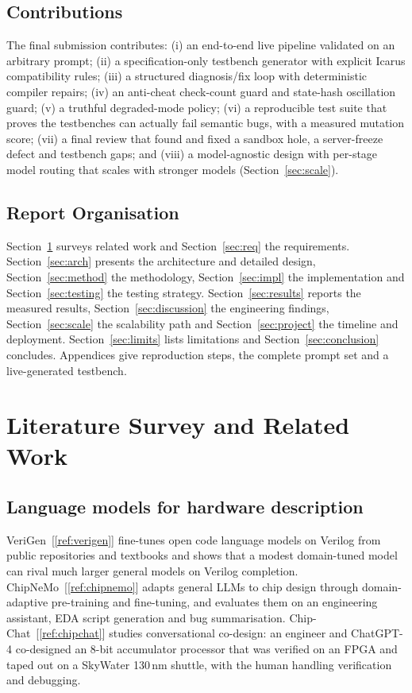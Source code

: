 \documentclass[11pt,a4paper]{article}
\renewcommand{\cite}[1]{[\ref{ref:#1}]}
\begin{document}
\subsection{Contributions}
The final submission contributes: (i) an end-to-end live pipeline validated on an
arbitrary prompt; (ii) a specification-only testbench generator with explicit Icarus
compatibility rules; (iii) a structured diagnosis/fix loop with deterministic
compiler repairs; (iv) an anti-cheat check-count guard and state-hash oscillation
guard; (v) a truthful degraded-mode policy; (vi) a reproducible test suite that
proves the testbenches can actually fail semantic bugs, with a measured mutation score; (vii) a final review that found and fixed a sandbox hole, a server-freeze defect and testbench gaps; and (viii) a model-agnostic design with per-stage model routing that scales with stronger models (Section~\ref{sec:scale}).

\subsection{Report Organisation}
Section~\ref{sec:related} surveys related work and Section~\ref{sec:req} the requirements. Section~\ref{sec:arch} presents the architecture and detailed design, Section~\ref{sec:method} the methodology, Section~\ref{sec:impl} the implementation and Section~\ref{sec:testing} the testing strategy. Section~\ref{sec:results} reports the measured results, Section~\ref{sec:discussion} the engineering findings, Section~\ref{sec:scale} the scalability path and Section~\ref{sec:project} the timeline and deployment. Section~\ref{sec:limits} lists limitations and Section~\ref{sec:conclusion} concludes. Appendices give reproduction steps, the complete prompt set and a live-generated testbench.

\section{Literature Survey and Related Work}
\label{sec:related}

\subsection{Language models for hardware description}
VeriGen~\cite{verigen} fine-tunes open code language models on Verilog from public repositories and textbooks and shows that a modest domain-tuned model can rival much larger general models on Verilog completion. ChipNeMo~\cite{chipnemo} adapts general LLMs to chip design through domain-adaptive pre-training and fine-tuning, and evaluates them on an engineering assistant, EDA script generation and bug summarisation. Chip-Chat~\cite{chipchat} studies conversational co-design: an engineer and ChatGPT-4 co-designed an 8-bit accumulator processor that was verified on an FPGA and taped out on a SkyWater 130\,nm shuttle, with the human handling verification and debugging.
\end{document}
